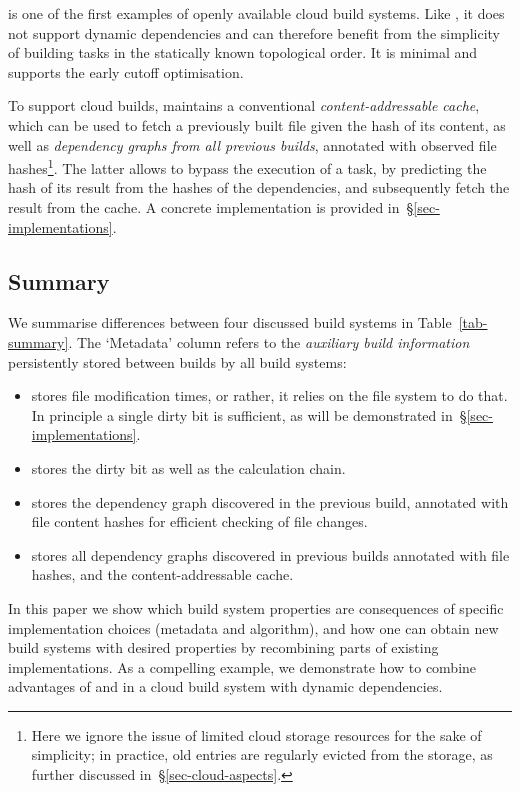 \Bazel is one of the first examples of openly available cloud build systems.
Like \Make, it does not support dynamic dependencies and can therefore benefit
from the simplicity of building tasks in the statically known topological order.
It is minimal and supports the early cutoff optimisation.

To support cloud builds, \Bazel maintains a conventional \emph{content-addressable
cache}, which can be used to fetch a previously built file given the hash of its
content, as well as \emph{dependency graphs from all previous builds}, annotated
with observed file hashes\footnote{Here we ignore the issue of limited cloud
storage resources for the sake of simplicity; in practice, old entries are
regularly evicted from the storage, as further discussed
in~\S\ref{sec-cloud-aspects}.}. The latter allows to bypass the execution of
a task, by predicting the hash of its result from the hashes of the dependencies,
and subsequently fetch the result from the cache. A concrete implementation is
provided in~\S\ref{sec-implementations}.

\subsection{Summary}
\label{sec-background-summary}

We summarise differences between four discussed build systems in
Table~\ref{tab-summary}. The `Metadata' column refers to the \emph{auxiliary
build information} persistently stored between builds by all build systems:
\begin{itemize}
    \item \Make stores file modification times, or rather, it relies on the file
    system to do that. In principle a single dirty bit is sufficient, as will be
    demonstrated in~\S\ref{sec-implementations}.
    \item \Excel stores the dirty bit as well as the calculation chain.
    \item \Shake stores the dependency graph discovered in the previous build,
    annotated with file content hashes for efficient checking of file changes.
    \item \Bazel stores all dependency graphs discovered in previous builds
    annotated with file hashes, and the content-addressable cache.
\end{itemize}

In this paper we show which build system properties are consequences of specific
implementation choices (metadata and algorithm), and how one can obtain new
build systems with desired properties by recombining parts of existing
implementations. As a compelling example, we demonstrate how to combine
advantages of \Shake and \Bazel in a cloud build system with dynamic dependencies.

